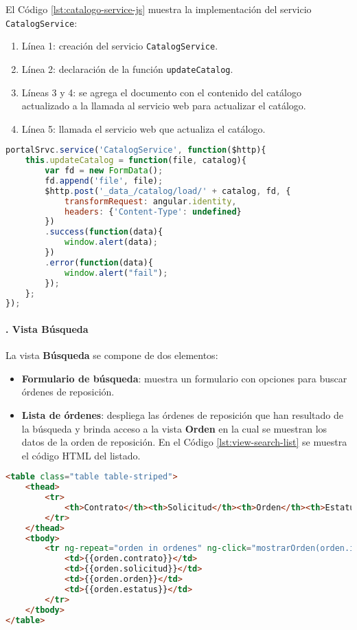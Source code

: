 El Código \ref{lst:catalogo-service-js} muestra la implementación del servicio \texttt{CatalogService}:
\begin{enumerate}
	\item Línea 1: creación del servicio \texttt{CatalogService}.
	\item Línea 2: declaración de la función \texttt{updateCatalog}.
	\item Líneas 3 y 4: se agrega el documento con el contenido del catálogo actualizado a la llamada al servicio web para actualizar el catálogo.
	\item Línea 5: llamada el servicio web que actualiza el catálogo.
\end{enumerate}
\begin{lstlisting}[language=Javascript, caption={Servicio en \textit{AngularJS} actualizar un catálogo.}, captionpos=b, label={lst:catalogo-service-js}]
portalSrvc.service('CatalogService', function($http){
	this.updateCatalog = function(file, catalog){
		var fd = new FormData();
		fd.append('file', file);
		$http.post('_data_/catalog/load/' + catalog, fd, {
			transformRequest: angular.identity,
			headers: {'Content-Type': undefined}
		})
		.success(function(data){
			window.alert(data);
		})
		.error(function(data){
			window.alert("fail");
		});
    };	
});
\end{lstlisting}

\paragraph{. Vista Búsqueda\\}
La vista \textbf{Búsqueda} se compone de dos elementos:
\begin{itemize}
	\item \textbf{Formulario de búsqueda}: muestra un formulario con opciones para buscar órdenes de reposición.
	\item \textbf{Lista de órdenes}: despliega las órdenes de reposición que han resultado de la búsqueda y brinda acceso a la vista \textbf{Orden} en la cual se muestran los datos de la orden de reposición. En el Código \ref{lst:view-search-list} se muestra el código HTML del listado.
\end{itemize}

\begin{lstlisting}[language=HTML, captionpos=b, caption={Plantilla que muestra el resultado de la búsqueda de órdenes de reposición.}, label={lst:view-search-list}]
<table class="table table-striped">
	<thead>
		<tr>
			<th>Contrato</th><th>Solicitud</th><th>Orden</th><th>Estatus</th>
		</tr>
	</thead>
	<tbody>
		<tr ng-repeat="orden in ordenes" ng-click="mostrarOrden(orden.id, $event)">
			<td>{{orden.contrato}}</td>
			<td>{{orden.solicitud}}</td>
			<td>{{orden.orden}}</td>
			<td>{{orden.estatus}}</td>
		</tr>
	</tbody>
</table>
\end{lstlisting}

